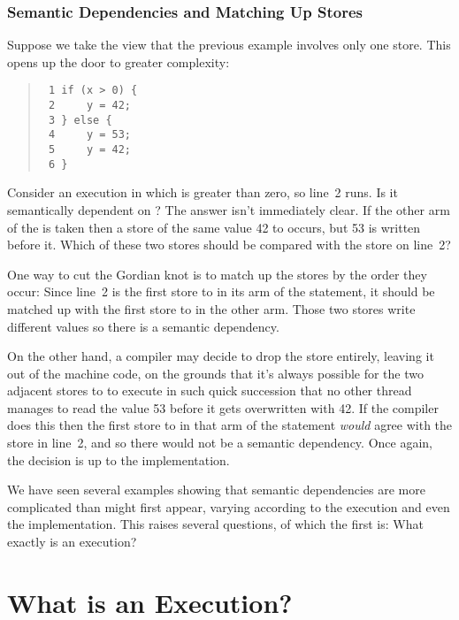 \subsubsection{Semantic Dependencies and Matching Up Stores}
\label{sec:Semantic Dependencies and Matching Up Stores}

Suppose we take the view that the previous example involves only one
store.
This opens up the door to greater complexity:
\begin{quote}
\begin{verbatim}
 1 if (x > 0) {
 2     y = 42;
 3 } else {
 4     y = 53;
 5     y = 42;
 6 }
\end{verbatim}
\end{quote}
Consider an execution in which  is greater than zero, so line~2
runs.
Is it semantically dependent on ?
The answer isn't immediately clear.
If the other arm of the  is taken then a store of the same value 42 to
 occurs, but 53 is written before it.
Which of these two stores should be compared with the store on line~2?

One way to cut the Gordian knot is to match up the stores by the order
they occur:
Since line~2 is the first store to  in its arm of the 
statement, it should be matched up with the first store to  in
the other arm.
Those two stores write different values so there is a semantic
dependency.

On the other hand, a compiler may decide to drop the  store entirely, leaving it out of the machine code,
on the grounds that it's always possible for the two adjacent stores
to  to execute in such quick succession that no other thread
manages to read the value 53 before it gets overwritten with 42.
If the compiler does this then the first store to  in that
arm of the  statement \emph{would} agree with the store in
line~2, and so there would not be a semantic dependency.
Once again, the decision is up to the implementation.

We have seen several examples showing that semantic dependencies are more
complicated than might first appear, varying according to the execution
and even the implementation.
This raises several questions, of which the first is:
What exactly is an execution?

\section{What is an Execution?}
\label{sec:What is an Execution?}

